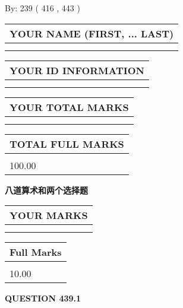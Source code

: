 \documentclass{ctexart}
\begin{document}
   
\hspace{1.0in} By: 
 239 ( 416 ,  443 )
   
   
   
   
\newpage 
\setcounter{page}{ 
   439001 } 
   
   
   
   
\noindent\begin{tabular}{|l|}
\hline
YOUR NAME (FIRST, ... LAST)  \\
\hline
 \\ 
 \\ 
\hline
\end{tabular}
\hspace{0.05in} \begin{tabular}{|l|}
\hline
 YOUR   ID   INFORMATION  \\
\hline
 \\ 
 \\ 
\hline
\end{tabular}
   
   
\vspace{0.2in}\noindent\begin{tabular}{|l|}
\hline
YOUR TOTAL MARKS  \\
\hline
 \\ 
 \\ 
\hline
\end{tabular}
\hspace{0.05in} \begin{tabular}{|l|}
\hline
TOTAL FULL MARKS  \\
\hline
 \\ 
100.00 \\
\hline
\end{tabular}
   
   
 \vspace{0.2in}
{\LARGE {\textbf{ 八道算术和两个选择题}}}
   
   
  
\vspace{0.2in}
  
\noindent\begin{tabular}{|l|}
\hline
 YOUR MARKS  \\
\hline
 \\ 
 \\ 
\hline
\end{tabular}
\hspace{0.05in} \begin{tabular}{|l|}
\hline
 Full Marks  \\
\hline
 \\ 
10.00 \\
\hline
\end{tabular}
{\textbf{\Large{QUESTION
439.1 
}}}
  
\end{document}
